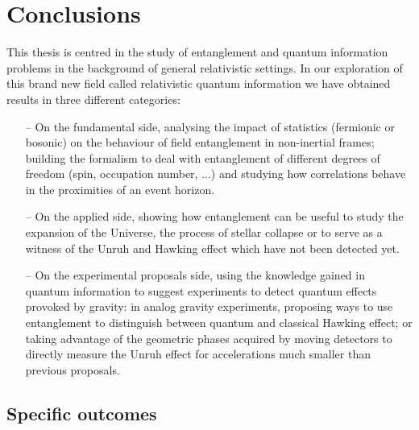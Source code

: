{\renewcommand{\thechapter}{}\renewcommand{\chaptername}{}
\addtocounter{chapter}{0}
\chapter*{Conclusions}}


This thesis is centred in the study of entanglement and quantum information problems in the background of general relativistic settings. In our exploration  of this brand new field called relativistic quantum information  we have obtained results in three different categories:

\begin{itemize}
\item[--]On the fundamental side, analysing the impact of statistics (fermionic or bosonic) on the behaviour of field entanglement in non-inertial frames; building the formalism to deal with entanglement of different degrees of freedom (spin, occupation number, ...) and studying how correlations behave in the proximities of an event horizon. 
\item[--]On the applied side, showing how entanglement can be useful to study the expansion of the Universe, the process of stellar collapse or to serve as a witness of the Unruh and Hawking effect which have not been detected yet.
\item[--]On the experimental proposals side, using the knowledge gained in quantum information to suggest experiments to detect quantum effects provoked by gravity: in analog gravity experiments, proposing ways to use entanglement to distinguish between quantum and classical Hawking effect; or taking advantage of the geometric phases acquired by moving detectors to directly measure the Unruh effect for accelerations much smaller than previous proposals.
\end{itemize}


\section*{Specific outcomes}

